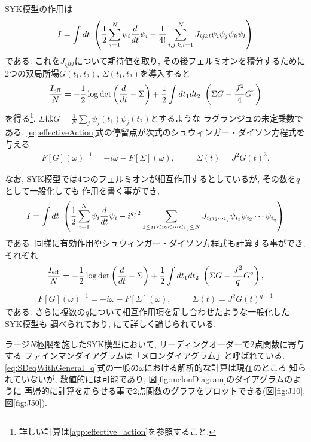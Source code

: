 SYK模型の作用は
\begin{align}
  I = \int dt\ \left(\frac{1}{2}\sum_{i = 1}^{N} \psi_i \frac{d}{dt} \psi_i
		- \frac{1}{4!} \sum_{i,j,k,l = 1}^{N} J_{ijkl} \psi_i\psi_j\psi_k\psi_l
    \right)
\end{align}
である. 
これを$J_{ijkl}$について期待値を取り, その後フェルミオンを積分するために
2つの双局所場$G(t_1, t_2)$, $\Sigma(t_1, t_2)$を導入すると
\begin{align}
  \frac{I_{\mathrm{eff}}}{N} =
		- \frac{1}{2}\log\det\left(\frac{d}{dt} - \Sigma\right)
		+ \frac{1}{2}\int dt_1dt_2\ \left(\Sigma G - \frac{J^2}{4}G^4\right)
  \label{eq:effectiveAction}
\end{align}
を得る\footnote{詳しい計算は\ref{app:effective_action}を参照すること.}. 
$\Sigma$は$G = \frac{1}{N}\sum_j \psi_j(t_1)\psi_j(t_2)$とするような
ラグランジュの未定乗数である. 
\eqref{eq:effectiveAction}式の停留点が次式のシュウィンガー・ダイソン方程式を与える:
\begin{align}
  F[G](\omega)^{-1} = -i\omega - F[\Sigma](\omega),
  \hspace{30pt}
  \Sigma(t) = J^2G(t)^3.
  \label{eq:SDeq}
\end{align}

なお, SYK模型では4つのフェルミオンが相互作用するとしているが, その数を$q$として一般化しても
作用を書く事ができ,
\begin{align}
	I = \int dt\ \left(
		\frac{1}{2}\sum_{i = 1}^N \psi_i\frac{d}{dt} \psi_i	
		- i^{q/2}\sum_{1\leq i_1 < i_2 < \cdots < i_q \leq N}J_{i_1i_2\cdots i_q}\psi_{i_1}\psi_{i_2}\cdots\psi_{i_q}
	\right)
\end{align}
である.
同様に有効作用やシュウィンガー・ダイソン方程式も計算する事ができ, それぞれ
\begin{align}
  \frac{I_{\mathrm{eff}}}{N} =
		- \frac{1}{2}\log\det\left(\frac{d}{dt} - \Sigma\right)
		+ \frac{1}{2}\int dt_1dt_2\ \left(\Sigma G - \frac{J^2}{q}G^q\right),
  \label{eq:effectiveActionWithGeneral_q}
\end{align}
\begin{align}
  F[G](\omega)^{-1} = -i\omega - F[\Sigma](\omega),
  \hspace{30pt}
  \Sigma(t) = J^2G(t)^{q-1}
  \label{eq:SDeqWithGeneral_q}
\end{align}
である. さらに複数の$q$について相互作用項を足し合わせたような一般化したSYK模型も
調べられており, \cite{gross}にて詳しく論じられている. 

ラージ$N$極限を施したSYK模型において, リーディングオーダーで2点関数に寄与する
ファインマンダイアグラムは「メロンダイアグラム」と呼ばれている. 
\eqref{eq:SDeqWithGeneral_q}式の一般の$\omega$における解析的な計算は現在のところ
知られていないが, 数値的には可能であり, 図\ref{fig:melonDiagram}のダイアグラムのように
再帰的に計算を走らせる事で2点関数のグラフをプロットできる(図\ref{fig:J10}, 図\ref{fig:J50}). 

